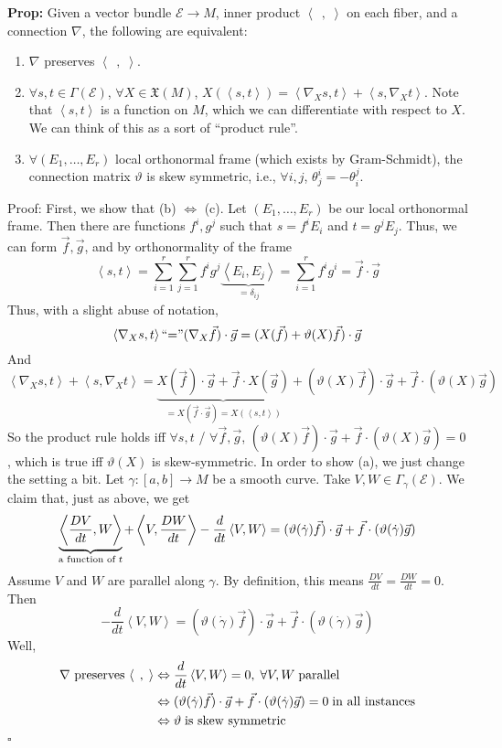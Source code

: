 \documentclass[10pt,letterpaper]{article}
\newcommand{\n}{\hfill\break}
\newcommand{\nn}{\vspace{0.5\baselineskip}\n}
\newcommand{\up}{\vspace{-\baselineskip}}
\newcommand{\hangblock}[2]{\par\noindent\settowidth{\hangindent}{\textbf{#1: }}\textbf{#1: }\nolinebreak#2}
\newcommand{\prop}[1]{\hangblock{Prop}{#1}}
\newcommand{\proven}{\;$\square$\n}
\newcommand{\ptxt}[1]{\textrm{\textnormal{#1}}}
\newcommand{\iprod}[1]{\left<#1\right>}
\newcommand{\giprod}{\iprod{\;\,,\;}}
\newcommand{\mf}[1]{\mathfrak{#1}}
\begin{document}
\prop{
	Given a vector bundle $\mathcal{E}\to{}M$, inner product $\giprod$ on each fiber, and a connection $\nabla$, the following are equivalent:
	\begin{enumerate}[label=(\alph*), leftmargin=4\parindent]
		\item $\nabla$ preserves $\giprod$.
		\item $\forall{}s,t\in\Gamma(\mathcal{E})$, $\forall{}X\in\mf{X}(M)$, $X(\iprod{s,t})=\iprod{\nabla_{X}s,t}+\iprod{s,\nabla_{X}t}$. Note that $\iprod{s,t}$ is a function on $M$, which we can differentiate with respect to $X$. We can think of this as a sort of ``product rule''.
		\item $\forall(E_{1},\ldots,E_{r})$ local orthonormal frame (which exists by Gram-Schmidt), the connection matrix $\vartheta$ is skew symmetric, i.e., $\forall{}i,j$, $\theta_{j}^{i}=-\theta_{i}^{j}$.
	\end{enumerate}\up\n
	Proof: First, we show that (b) $\Leftrightarrow$ (c). Let $(E_{1},\ldots,E_{r})$ be our local orthonormal frame. Then there are functions $f^{i},g^{j}$ such that $s=f^{i}E_{i}$ and $t=g^{j}E_{j}$. Thus, we can form $\vec{f},\vec{g}$, and by orthonormality of the frame
	\[
		\iprod{s,t}=\sum_{i=1}^{r}\sum_{j=1}^{r}f^{i}g^{j}\underbrace{\iprod{E_{i},E_{j}}}_{=\delta_{ij}}=\sum_{i=1}^{r}f^{i}g^{i}=\vec{f}\cdot\vec{g}
	\]
	Thus, with a slight abuse of notation,
	\[
		\iprod{\nabla_{X}s,t}\ptxt{``=''}(\nabla_{X}\vec{f})\cdot\vec{g}=(X(\vec{f})+\vartheta(X)\vec{f})\cdot\vec{g}
	\]
	And
	\[
		\iprod{\nabla_{X}s,t}+\iprod{s,\nabla_{X}t}=\underbrace{X(\vec{f})\cdot\vec{g}+\vec{f}\cdot{}X(\vec{g})}_{=X(\vec{f}\cdot\vec{g})=X(\iprod{s,t})}+(\vartheta(X)\vec{f})\cdot\vec{g}+\vec{f}\cdot(\vartheta(X)\vec{g})
	\]
	So the product rule holds iff $\forall{}s,t$ / $\forall\vec{f},\vec{g}$, $(\vartheta(X)\vec{f})\cdot\vec{g}+\vec{f}\cdot(\vartheta(X)\vec{g})=0$, which is true iff $\vartheta(X)$ is skew-symmetric.\nn
	In order to show (a), we just change the setting a bit. Let $\gamma:[a,b]\to{}M$ be a smooth curve. Take $V,W\in\Gamma_{\gamma}(\mathcal{E})$. We claim that, just as above, we get
	\[
		\underbrace{\iprod{\frac{DV}{dt},W}}_{\mathclap{\ptxt{a function of $t$}}}+\iprod{V,\frac{DW}{dt}}-\frac{d}{dt}\iprod{V,W}=(\vartheta(\dot\gamma)\vec{f})\cdot\vec{g}+\vec{f}\cdot(\vartheta(\dot\gamma)\vec{g})
	\]
	Assume $V$ and $W$ are parallel along $\gamma$. By definition, this means $\frac{DV}{dt}=\frac{DW}{dt}=0$. Then
	\[
		-\frac{d}{dt}\iprod{V,W}=(\vartheta(\dot\gamma)\vec{f})\cdot\vec{g}+\vec{f}\cdot(\vartheta(\dot\gamma)\vec{g})
	\]
	Well,
	\begin{align*}
		\ptxt{$\nabla$ preserves $\giprod$} & \Leftrightarrow\frac{d}{dt}\iprod{V,W}=0,\;\forall{}V,W\;\ptxt{parallel}\\
		& \Leftrightarrow(\vartheta(\dot\gamma)\vec{f})\cdot\vec{g}+\vec{f}\cdot(\vartheta(\dot\gamma)\vec{g})=0\;\ptxt{in all instances}\\
		& \Leftrightarrow\vartheta\;\ptxt{is skew symmetric}
	\end{align*}
	\proven
}
\end{document}
